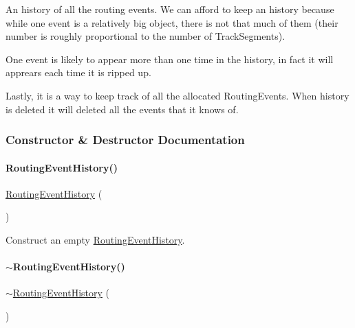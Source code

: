 An history of all the routing events. We can afford to keep an history because while one event is a relatively big object, there is not that much of them (their number is roughly proportional to the number of Track\+Segments).

One event is likely to appear more than one time in the history, in fact it will apprears each time it is ripped up.

Lastly, it is a way to keep track of all the allocated Routing\+Events. When history is deleted it will deleted all the events that it knows of. 

\subsubsection{Constructor \& Destructor Documentation}
\mbox{\label{classKite_1_1RoutingEventHistory_af286a3887c4925a37eadc8018d584aa3}} 
\paragraph{\texorpdfstring{Routing\+Event\+History()}{RoutingEventHistory()}}
{\footnotesize\ttfamily \mbox{\hyperlink{classKite_1_1RoutingEventHistory}{Routing\+Event\+History}} (\begin{DoxyParamCaption}{ }\end{DoxyParamCaption})}

Construct an empty \mbox{\hyperlink{classKite_1_1RoutingEventHistory}{Routing\+Event\+History}}. \mbox{\label{classKite_1_1RoutingEventHistory_a5a7671b3e27e93b018cf407a7eba9ce7}} 
\paragraph{\texorpdfstring{$\sim$\+Routing\+Event\+History()}{~RoutingEventHistory()}}
{\footnotesize\ttfamily $\sim$\mbox{\hyperlink{classKite_1_1RoutingEventHistory}{Routing\+Event\+History}} (\begin{DoxyParamCaption}{ }\end{DoxyParamCaption})}

